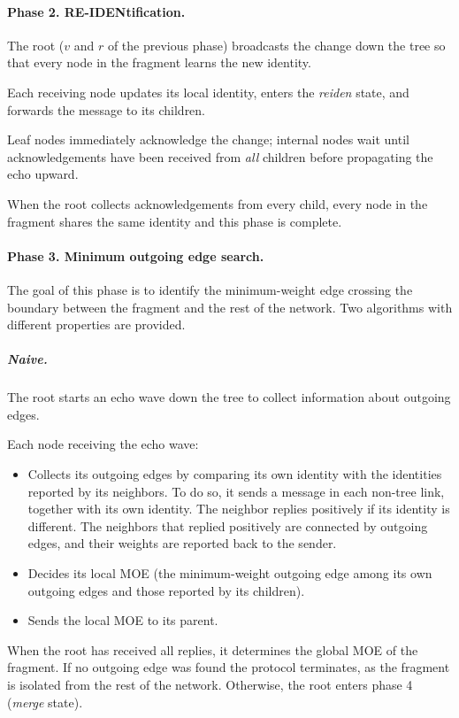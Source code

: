 \paragraph{Phase 2. RE-IDENtification.}

The root ($v$ and $r$ of the previous phase) broadcasts the change down the tree so that
every node in the fragment learns the new identity.

Each receiving node updates its local identity, enters the \emph{reiden} state, and
forwards the message to its children.

Leaf nodes immediately acknowledge the change; internal nodes wait until acknowledgements
have been received from \emph{all} children before propagating the echo upward.

When the root collects acknowledgements from every child, every node in the fragment
shares the same identity and this phase is complete.

\paragraph{Phase 3. Minimum outgoing edge search.}

The goal of this phase is to identify the minimum-weight edge crossing the boundary
between the fragment and the rest of the network.
Two algorithms with different properties are provided.

\subparagraph{Naive.}

The root starts an echo wave down the tree to collect information about outgoing edges.

Each node receiving the echo wave:
\begin{itemize}
\item Collects its outgoing edges by comparing its own identity with the identities
reported by its neighbors. To do so, it sends a message in each non-tree link, together
with its own identity. The neighbor replies positively if its identity is different. The
neighbors that replied positively are connected by outgoing edges, and their weights are
reported back to the sender.
\item Decides its local MOE (the minimum-weight outgoing edge among its own outgoing edges
and those reported by its children).
\item Sends the local MOE to its parent.
\end{itemize}

When the root has received all replies, it determines the global MOE of the fragment. If
no outgoing edge was found the protocol terminates, as the fragment is isolated from the
rest of the network. Otherwise, the root enters phase 4 (\emph{merge} state).

